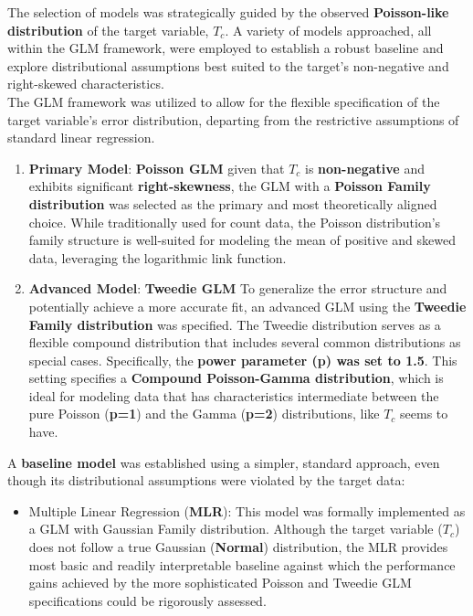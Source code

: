 \documentclass[conference]{IEEEtran}
\begin{document}
The selection of models was strategically guided by the observed \textbf{Poisson-like distribution} of the target variable, $T_c$. A variety of models approached, all within the GLM framework, were employed to establish a robust baseline and explore distributional assumptions best suited to the target's non-negative and right-skewed characteristics.\\
\indent The GLM framework was utilized to allow for the flexible specification of the target variable's error distribution, departing from the restrictive assumptions of standard linear regression.\\
\begin{enumerate}
	\item \textbf{Primary Model}: \textbf{Poisson GLM} given that $T_c$ is \textbf{ non-negative} and exhibits significant  \textbf{right-skewness}, the GLM with a \textbf{Poisson Family distribution} was selected as the primary and most theoretically aligned choice. While traditionally used for count data, the Poisson distribution's family structure is well-suited for modeling the mean of positive and skewed data, leveraging the logarithmic link function.
	\item \textbf{Advanced Model}: \textbf{Tweedie GLM} To generalize the error structure and potentially achieve a more accurate fit, an advanced GLM using the \textbf{Tweedie Family distribution} was specified. The Tweedie distribution serves as a flexible compound distribution that includes several common distributions as special cases. Specifically, the \textbf{power parameter (p) was set to 1.5}. This setting specifies a \textbf{Compound Poisson-Gamma distribution}, which is ideal for modeling data that has characteristics intermediate between the pure Poisson (\textbf{p=1}) and the Gamma (\textbf{p=2}) distributions, like $T_c$ seems to have.\\
\end{enumerate}

A \textbf{baseline model} was established using a simpler, standard approach, even though its distributional assumptions were violated by the target data:
\begin{itemize}
	\item Multiple Linear Regression (\textbf{MLR}): This model was formally implemented as a GLM with Gaussian Family distribution. Although the target variable ($T_c$) does not follow a true Gaussian (\textbf{Normal}) distribution, the MLR provides most basic and readily interpretable baseline against which the performance gains achieved by the more sophisticated Poisson and Tweedie GLM specifications could be rigorously assessed.\\
\end{itemize}
\end{document}
